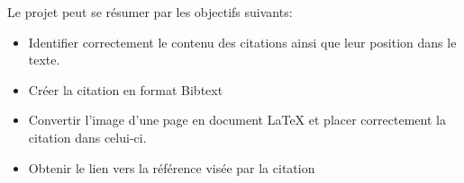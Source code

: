Le projet peut se résumer par les objectifs suivants:

\begin{itemize}
    \item Identifier correctement le contenu des citations ainsi que leur position dans le texte.
    \item Créer la citation en format Bibtext
    \item Convertir l'image d'une page en document LaTeX et placer correctement la citation dans celui-ci.
    \item Obtenir le lien vers la référence visée par la citation
\end{itemize}
